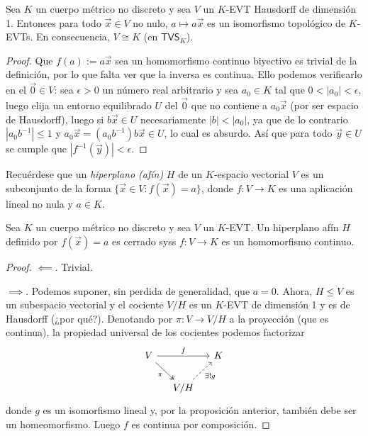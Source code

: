 \documentclass[topologia-analisis.tex]{subfiles}
\begin{document}
\begin{prop}
	Sea $K$ un cuerpo métrico no discreto y sea $V$ un $K$-EVT Hausdorff de dimensión 1.
	Entonces para todo $\vec x \in V$ no nulo, $a \mapsto a\vec x$ es un isomorfismo topológico de $K$-EVTs.
	En consecuencia, $V \cong K$ (en $\mathsf{TVS}_K$).
\end{prop}
\begin{proof}
	Que $f(a) := a\vec x$ sea un homomorfismo continuo biyectivo es trivial de la definición,
	por lo que falta ver que la inversa es continua.
	Ello podemos verificarlo en el $\Vec 0 \in V$:
	sea $\epsilon > 0$ un número real arbitrario y sea $a_0 \in K$ tal que $0 < |a_0| < \epsilon$, luego elija un entorno equilibrado $U$ del $\Vec 0$
	que no contiene a $a_0\vec x$ (por ser espacio de Hausdorff), luego si $b\vec x \in U$
	necesariamente $|b| < |a_0|$, ya que de lo contrario $|a_0b^{-1}| \le 1$ y $a_0\vec x = (a_0b^{-1})b\vec x \in U$, lo cual es absurdo.
	Así que para todo $\vec y \in U$ se cumple que $|f^{-1}(\vec y)| < \epsilon$.
\end{proof}

Recuérdese que un \emph{hiperplano (afín)} $H$ de un $K$-espacio vectorial $V$ es un subconjunto de la forma $\{ \vec x \in V : f(\vec x) = a \}$,
donde $f \colon V \to K$ es una aplicación lineal no nula y $a \in K$.
\begin{thm}
	Sea $K$ un cuerpo métrico no discreto y sea $V$ un $K$-EVT.
	Un hiperplano afín $H$ definido por $f(\vec x) = a$ es cerrado syss $f \colon V \to K$ es un homomorfismo continuo.
\end{thm}
\begin{proof}
	$\impliedby$. Trivial.

	$\implies$. Podemos suponer, sin perdida de generalidad, que $a = 0$.
	Ahora, $H \le V$ es un subespacio vectorial y el cociente $V/H$ es un $K$-EVT de dimensión 1 y es de Hausdorff (¿por qué?).
	Denotando por $\pi \colon V \to V/H$ a la proyección (que es continua), la propiedad universal de los cocientes podemos factorizar
	\[\begin{tikzcd}[column sep=small]
		V \ar[rr, "f"] \drar["\pi"', two heads] &                                 & K \\
			                                & V/H \urar["\exists!g"', dashed]
	\end{tikzcd}\]
	donde $g$ es un isomorfismo lineal y, por la proposición anterior, también debe ser un homeomorfismo.
	Luego $f$ es continua por composición.
\end{proof}
\end{document}
